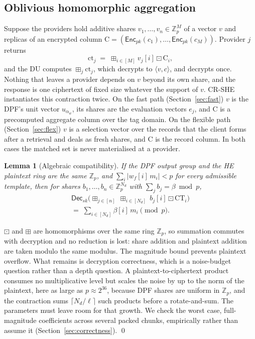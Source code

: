 \documentclass[a4paper,fleqn]{cas-dc}
\newtheorem{lemma}{Lemma}
\newcommand{\Dec}{\mathsf{Dec}}
\newcommand{\Enc}{\mathsf{Enc}}
\newcommand{\bplus}{\boxplus}
\newcommand{\bdot}{\boxdot}
\begin{document}
\subsection{Oblivious homomorphic aggregation}
\label{sec:oha}
Suppose the providers hold additive shares $v_1,\dots,v_n\in\mathbb{Z}_p^{M}$
of a vector $v$ and replicas of an encrypted column
$\mathrm{C}=(\Enc_{pk}(c_1),\dots,\Enc_{pk}(c_M))$. Provider $j$ returns
\[
\text{ct}_j \;=\; \bplus_{i\in[M]} v_j[i]\bdot \mathrm{C}_i ,
\]
and the DU computes $\bplus_j \text{ct}_j$, which decrypts to
$\langle v,c\rangle$, and decrypts once. Nothing that leaves a provider depends
on $v$ beyond its own share, and the response is one ciphertext of fixed size
whatever the support of $v$. CR-SHE instantiates this contraction twice. On the
fast path (Section~\ref{sec:fast}) $v$ is the DPF's unit vector $u_{\alpha_w}$,
its shares are the evaluation vectors $e_j$, and $\mathrm{C}$ is a precomputed
aggregate column over the tag domain. On the flexible path
(Section~\ref{sec:flex}) $v$ is a selection vector over the records that the
client forms after a retrieval and deals as fresh shares, and $\mathrm{C}$ is
the record column. In both cases the matched set is never materialised at a
provider.

\begin{lemma}[Algebraic compatibility]
\label{lem:compat}
If the DPF output group and the HE plaintext ring are the same $\mathbb{Z}_p$,
and $\sum_{i}|w_f[i]\,m_i| < p$ for every admissible template, then for shares
$b_1,\dots,b_n\in\mathbb{Z}_p^{N_d}$ with $\sum_j b_j = \beta \bmod p$,
\begin{multline*}
\Dec_{sk}\Big(\bplus_{j\in[n]}\ \bplus_{i\in[N_d]}\ b_j[i]\bdot
\text{CT}_i\Big)\\
=\; \sum_{i\in[N_d]} \beta[i]\,m_i \pmod p .
\end{multline*}
\end{lemma}
\begin{pf}
$\bdot$ and $\bplus$ are homomorphisms over the same ring $\mathbb{Z}_p$, so
summation commutes with decryption and no reduction is lost: share addition
and plaintext addition are taken modulo the same modulus. The magnitude bound
prevents plaintext overflow. What remains is decryption correctness, which is
a noise-budget question rather than a depth question. A
plaintext-to-ciphertext product consumes no multiplicative level but scales
the noise by up to the norm of the plaintext, here as large as
$p\approx2^{36}$, because DPF shares are uniform in $\mathbb{Z}_p$, and the
contraction sums $\lceil N_d/\ell\rceil$ such products before a
rotate-and-sum. The parameters must leave room for that growth. We check the
worst case, full-magnitude coefficients across several packed chunks,
empirically rather than assume it (Section~\ref{sec:correctness}). \qed
\end{pf}
\end{document}
